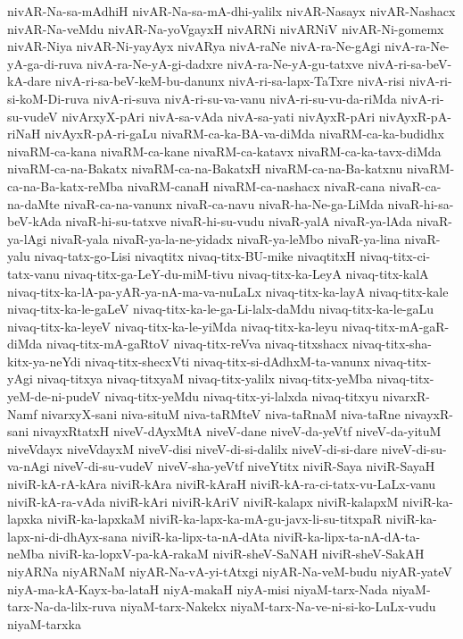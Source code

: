 {nivAR-Na-sa-mAdhiH
nivAR-Na-sa-mA-dhi-yalilx
nivAR-Nasayx
nivAR-Nashacx
nivAR-Na-veMdu
nivAR-Na-yoVgayxH
nivARNi
nivARNiV
nivAR-Ni-gomemx
nivAR-Niya
nivAR-Ni-yayAyx
nivARya
nivA-raNe
nivA-ra-Ne-gAgi
nivA-ra-Ne-yA-ga-di-ruva
nivA-ra-Ne-yA-gi-dadxre
nivA-ra-Ne-yA-gu-tatxve
nivA-ri-sa-beV-kA-dare
nivA-ri-sa-beV-keM-bu-danunx
nivA-ri-sa-lapx-TaTxre
nivA-risi
nivA-ri-si-koM-Di-ruva
nivA-ri-suva
nivA-ri-su-va-vanu
nivA-ri-su-vu-da-riMda
nivA-ri-su-vudeV
nivArxyX-pAri
nivA-sa-vAda
nivA-sa-yati
nivAyxR-pAri
nivAyxR-pA-riNaH
nivAyxR-pA-ri-gaLu
nivaRM-ca-ka-BA-va-diMda
nivaRM-ca-ka-budidhx
nivaRM-ca-kana
nivaRM-ca-kane
nivaRM-ca-katavx
nivaRM-ca-ka-tavx-diMda
nivaRM-ca-na-Bakatx
nivaRM-ca-na-BakatxH
nivaRM-ca-na-Ba-katxnu
nivaRM-ca-na-Ba-katx-reMba
nivaRM-canaH
nivaRM-ca-nashacx
nivaR-cana
nivaR-ca-na-daMte
nivaR-ca-na-vanunx
nivaR-ca-navu
nivaR-ha-Ne-ga-LiMda
nivaR-hi-sa-beV-kAda
nivaR-hi-su-tatxve
nivaR-hi-su-vudu
nivaR-yalA
nivaR-ya-lAda
nivaR-ya-lAgi
nivaR-yala
nivaR-ya-la-ne-yidadx
nivaR-ya-leMbo
nivaR-ya-lina
nivaR-yalu
nivaq-tatx-go-Lisi
nivaqtitx
nivaq-titx-BU-mike
nivaqtitxH
nivaq-titx-ci-tatx-vanu
nivaq-titx-ga-LeY-du-miM-tivu
nivaq-titx-ka-LeyA
nivaq-titx-kalA
nivaq-titx-ka-lA-pa-yAR-ya-nA-ma-va-nuLaLx
nivaq-titx-ka-layA
nivaq-titx-kale
nivaq-titx-ka-le-gaLeV
nivaq-titx-ka-le-ga-Li-lalx-daMdu
nivaq-titx-ka-le-gaLu
nivaq-titx-ka-leyeV
nivaq-titx-ka-le-yiMda
nivaq-titx-ka-leyu
nivaq-titx-mA-gaR-diMda
nivaq-titx-mA-gaRtoV
nivaq-titx-reVva
nivaq-titxshacx
nivaq-titx-sha-kitx-ya-neYdi
nivaq-titx-shecxVti
nivaq-titx-si-dAdhxM-ta-vanunx
nivaq-titx-yAgi
nivaq-titxya
nivaq-titxyaM
nivaq-titx-yalilx
nivaq-titx-yeMba
nivaq-titx-yeM-de-ni-pudeV
nivaq-titx-yeMdu
nivaq-titx-yi-lalxda
nivaq-titxyu
nivarxR-Namf
nivarxyX-sani
niva-situM
niva-taRMteV
niva-taRnaM
niva-taRne
nivayxR-sani
nivayxRtatxH
niveV-dAyxMtA
niveV-dane
niveV-da-yeVtf
niveV-da-yituM
niveVdayx
niveVdayxM
niveV-disi
niveV-di-si-dalilx
niveV-di-si-dare
niveV-di-su-va-nAgi
niveV-di-su-vudeV
niveV-sha-yeVtf
niveYtitx
niviR-Saya
niviR-SayaH
niviR-kA-rA-kAra
niviR-kAra
niviR-kAraH
niviR-kA-ra-ci-tatx-vu-LaLx-vanu
niviR-kA-ra-vAda
niviR-kAri
niviR-kAriV
niviR-kalapx
niviR-kalapxM
niviR-ka-lapxka
niviR-ka-lapxkaM
niviR-ka-lapx-ka-mA-gu-javx-li-su-titxpaR
niviR-ka-lapx-ni-di-dhAyx-sana
niviR-ka-lipx-ta-nA-dAta
niviR-ka-lipx-ta-nA-dA-ta-neMba
niviR-ka-lopxV-pa-kA-rakaM
niviR-sheV-SaNAH
niviR-sheV-SakAH
niyARNa
niyARNaM
niyAR-Na-vA-yi-tAtxgi
niyAR-Na-veM-budu
niyAR-yateV
niyA-ma-kA-Kayx-ba-lataH
niyA-makaH
niyA-misi
niyaM-tarx-Nada
niyaM-tarx-Na-da-lilx-ruva
niyaM-tarx-Nakekx
niyaM-tarx-Na-ve-ni-si-ko-LuLx-vudu
niyaM-tarxka
}
